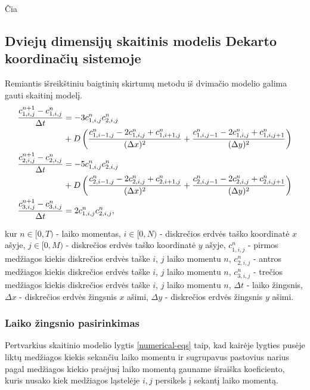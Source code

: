 \documentclass{VUMIFInfKursinis}
\begin{document}
Čia 

\newpage
\subsection{Dviejų dimensijų skaitinis modelis Dekarto koordinačių sistemoje}

Remiantis išreikštiniu baigtinių skirtumų metodu iš dvimačio modelio galima gauti skaitinį modelį.
\begin{subequations} \label{numerical-eqs}
\begin{align}
\frac{c^{n+1}_{1,i,j}-c^n_{1,i,j}}{\Delta t}&=
-3c^{n}_{1,i,j}c^{n}_{2,i,j}\notag\\
&+D\left(\frac{c^n_{1,i-1,j}-2c^n_{1,i,j}+c^n_{1,i+1,j}}{(\Delta x)^2}+\frac{c^n_{1,i,j-1}-2c^n_{1,i,j}+c^n_{1,i,j+1}}{(\Delta y)^2}\right)\\
\frac{c^{n+1}_{2,i,j}-c^n_{2,i,j}}{\Delta t}&=
-5c^{n}_{1,i,j}c^{n}_{2,i,j}\notag\\
&+D\left(\frac{c^n_{2,i-1,j}-2c^n_{2,i,j}+c^n_{2,i+1,j}}{(\Delta x)^2}+\frac{c^n_{2,i,j-1}-2c^n_{2,i,j}+c^n_{2,i,j+1}}{(\Delta y)^2}\right)\\
\frac{c^{n+1}_{3,i,j}-c^n_{3,i,j}}{\Delta t}&=2c^{n}_{1,i,j}c^{n}_{2,i,j},
\end{align}
\end{subequations}

kur $n\in[0, T)$ - laiko momentas, 
$i\in[0,N)$ - diskrečios erdvės taško koordinatė $x$ ašyje,
$j\in[0,M)$ - diskrečios erdvės taško koordinatė $y$ ašyje,
$c^n_{1,i,j}$ - pirmos medžiagos kiekis diskrečios erdvės taške $i$, $j$ laiko momentu $n$,
$c^n_{2,i,j}$ - antros medžiagos kiekis diskrečios erdvės taške $i$, $j$ laiko momentu $n$,
$c^n_{3,i,j}$ - trečios medžiagos kiekis diskrečios erdvės taške $i$, $j$ laiko momentu $n$,
$\Delta t$ - laiko žingsnis,
$\Delta x$ - diskrečios erdvės žingsnis $x$ ašimi,
$\Delta y$ - diskrečios erdvės žingsnis $y$ ašimi.

\newpage
\subsubsection{Laiko žingsnio pasirinkimas}

Pertvarkius skaitinio modelio lygtis \eqref{numerical-eqs} taip, kad kairėje lygties pusėje liktų 
medžiagos kiekis sekančiu laiko momentu ir sugrupavus pastovius narius pagal medžiagos kiekio
praėjusį laiko momentą gauname išraiška koeficiento, kuris nusako kiek medžiagos
ląstelėje $i,j$ persikels į sekantį laiko momentą.     
\end{document}
